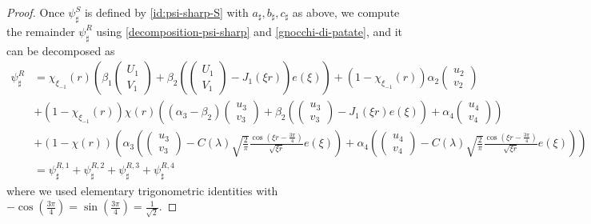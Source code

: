 \documentclass[11 pt]{amsart}
\theoremstyle{definition}
\theoremstyle{remark}
\numberwithin{equation}{section}
\begin{document}
\begin{proof}
Once $\psi_\sharp^S$ is defined by \eqref{id:psi-sharp-S} with $a_\sharp,b_\sharp,c_\sharp$ as above, we compute the remainder $\psi^R_\sharp$ using \eqref{decomposition-psi-sharp} and \eqref{gnocchi-di-patate}, and it can be decomposed as
\begin{align*}
\psi^R_\sharp &= \chi_{\xi_{-1}}(r)\left(\beta_1 \begin{pmatrix} U_1 \\V_1 \end{pmatrix}+\beta_2\left( \begin{pmatrix} U_1 \\V_1 \end{pmatrix}-J_1(\xi r)\right)e(\xi) \right)+(1-\chi_{\xi_{-1}}(r)) \alpha_2 \begin{pmatrix} u_2 \\ v_2 \end{pmatrix} \\
& +(1-\chi_{\xi_{-1}}(r))\chi(r)\left( (\alpha_3-\beta_2) \begin{pmatrix} u_3 \\ v_3 \end{pmatrix}+\beta_2 \left(\begin{pmatrix} u_3 \\ v_3 \end{pmatrix}-J_1(\xi r) e(\xi)\right)+\alpha_4  \begin{pmatrix} u_4 \\ v_4 \end{pmatrix} \right) \\
&+(1-\chi(r))\left(\alpha_3\left( \begin{pmatrix} u_3 \\ v_3 \end{pmatrix}-C(\lambda)\sqrt{\frac{2}{\pi}}\frac{\cos(\xi r-\frac{3\pi}{4})}{\sqrt{\xi r}}e(\xi)\right)+\alpha_4\left( \begin{pmatrix} u_4 \\ v_4 \end{pmatrix}-C(\lambda)\sqrt{\frac{2}{\pi}}\frac{\cos(\xi r-\frac{3\pi}{4})}{\sqrt{\xi r}}e(\xi)\right) \right)\\
&=\psi^{R,1}_\sharp+\psi^{R,2}_\sharp+\psi^{R,3}_\sharp+\psi^{R,4}_\sharp
\end{align*}
where we used elementary trigonometric identities with $-\cos(\frac{3\pi}{4})=\sin(\frac{3\pi}{4})=\frac{1}{\sqrt{2}}$.

\smallskip


\end{proof}
\end{document}
